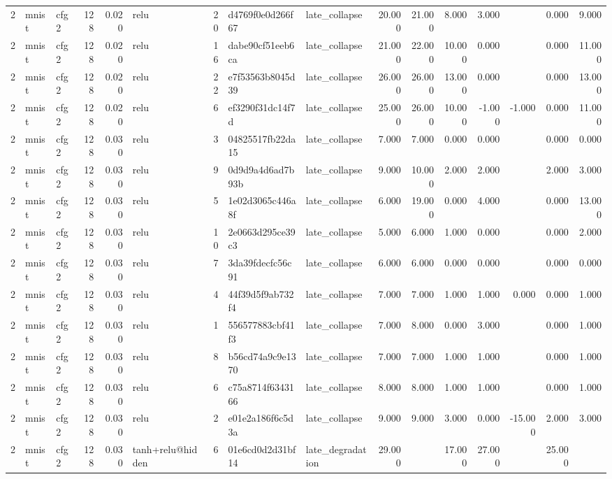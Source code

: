 \begin{table}[htbp]
{\begin{tabular}{@{}rllrrlrllrrrrrrr@{}}
2 & mnist & cfg2 & 128 & 0.020 & relu & 20 & d4769f0e0d266f67 & late\_collapse & 20.000 & 21.000 & 8.000 & 3.000 &  & 0.000 & 9.000 \\
2 & mnist & cfg2 & 128 & 0.020 & relu & 16 & dabe90cf51eeb6ca & late\_collapse & 21.000 & 22.000 & 10.000 & 0.000 &  & 0.000 & 11.000 \\
2 & mnist & cfg2 & 128 & 0.020 & relu & 22 & e7f53563b8045d39 & late\_collapse & 26.000 & 26.000 & 13.000 & 0.000 &  & 0.000 & 13.000 \\
2 & mnist & cfg2 & 128 & 0.020 & relu & 6 & ef3290f31dc14f7d & late\_collapse & 25.000 & 26.000 & 10.000 & -1.000 & -1.000 & 0.000 & 11.000 \\
2 & mnist & cfg2 & 128 & 0.030 & relu & 3 & 04825517fb22da15 & late\_collapse & 7.000 & 7.000 & 0.000 & 0.000 &  & 0.000 & 0.000 \\
2 & mnist & cfg2 & 128 & 0.030 & relu & 9 & 0d9d9a4d6ad7b93b & late\_collapse & 9.000 & 10.000 & 2.000 & 2.000 &  & 2.000 & 3.000 \\
2 & mnist & cfg2 & 128 & 0.030 & relu & 5 & 1e02d3065c446a8f & late\_collapse & 6.000 & 19.000 & 0.000 & 4.000 &  & 0.000 & 13.000 \\
2 & mnist & cfg2 & 128 & 0.030 & relu & 10 & 2e0663d295ce39c3 & late\_collapse & 5.000 & 6.000 & 1.000 & 0.000 &  & 0.000 & 2.000 \\
2 & mnist & cfg2 & 128 & 0.030 & relu & 7 & 3da39fdecfc56c91 & late\_collapse & 6.000 & 6.000 & 0.000 & 0.000 &  & 0.000 & 0.000 \\
2 & mnist & cfg2 & 128 & 0.030 & relu & 4 & 44f39d5f9ab732f4 & late\_collapse & 7.000 & 7.000 & 1.000 & 1.000 & 0.000 & 0.000 & 1.000 \\
2 & mnist & cfg2 & 128 & 0.030 & relu & 1 & 556577883cbf41f3 & late\_collapse & 7.000 & 8.000 & 0.000 & 3.000 &  & 0.000 & 1.000 \\
2 & mnist & cfg2 & 128 & 0.030 & relu & 8 & b56cd74a9c9e1370 & late\_collapse & 7.000 & 7.000 & 1.000 & 1.000 &  & 0.000 & 1.000 \\
2 & mnist & cfg2 & 128 & 0.030 & relu & 6 & c75a8714f6343166 & late\_collapse & 8.000 & 8.000 & 1.000 & 1.000 &  & 0.000 & 1.000 \\
2 & mnist & cfg2 & 128 & 0.030 & relu & 2 & e01e2a186f6c5d3a & late\_collapse & 9.000 & 9.000 & 3.000 & 0.000 & -15.000 & 2.000 & 3.000 \\
2 & mnist & cfg2 & 128 & 0.030 & tanh+relu@hidden & 6 & 01e6cd0d2d31bf14 & late\_degradation & 29.000 &  & 17.000 & 27.000 &  & 25.000 &  \\

\end{tabular}}
\end{table}
